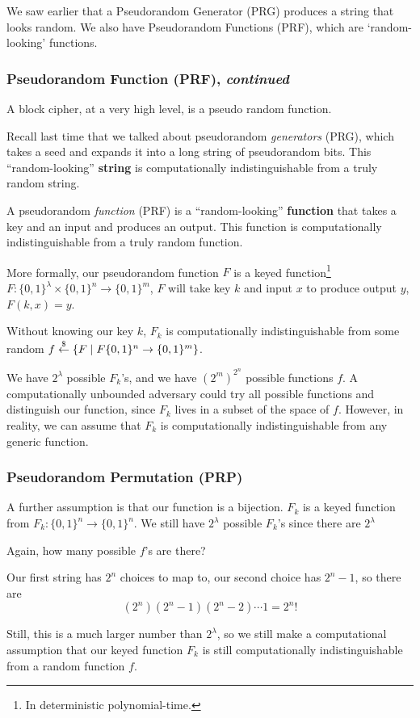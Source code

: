 We saw earlier that a Pseudorandom Generator (PRG) produces a string that looks random. We also have Pseudorandom Functions (PRF), which are `random-looking' functions.

\subsubsection{Pseudorandom Function (PRF), \emph{continued}}

A block cipher, at a very high level, is a pseudo random function.

Recall last time that we talked about pseudorandom \emph{generators} (PRG), which takes a seed and expands it into a long string of pseudorandom bits. This ``random-looking'' \textbf{string} is computationally indistinguishable from a truly random string.

A pseudorandom \emph{function} (PRF) is a ``random-looking'' \textbf{function} that takes a key and an input and produces an output. This function is computationally indistinguishable from a truly random function.

More formally, our pseudorandom function $F$ is a keyed function\footnote{In deterministic polynomial-time.} $F : \{0, 1\}^\lambda\times \{0, 1\}^n\to\{0, 1\}^m$, $F$ will take key $k$ and input $x$ to produce output $y$, $F(k, x) = y$.

Without knowing our key $k$, $F_k$ is computationally indistinguishable from some random $f\overset{\$}{\leftarrow}\{F\mid F\{0, 1\}^n\to \{0, 1\}^m\}$.


We have $2^\lambda$ possible $F_k$'s, and we have $(2^m)^{2^n}$ possible functions $f$. A computationally unbounded adversary could try all possible functions and distinguish our function, since $F_k$ lives in a subset of the space of $f$. However, in reality, we can assume that $F_k$ is computationally indistinguishable from any generic function.

\subsubsection{Pseudorandom Permutation (PRP)}

A further assumption is that our function is a bijection. $F_k$ is a keyed function from $F_k : \{0, 1\}^n\to\{0, 1\}^n$. We still have $2^\lambda$ possible $F_k$'s since there are $2^\lambda$


\begin{ques*}
    Again, how many possible $f$'s are there?
\end{ques*}
Our first string has $2^n$ choices to map to, our second choice has $2^n - 1$, so there are
\[(2^n)(2^n-1)(2^n-2)\cdots 1 = 2^n!\]

Still, this is a much larger number than $2^\lambda$, so we still make a computational assumption that our keyed function $F_k$ is still computationally indistinguishable from a random function $f$.